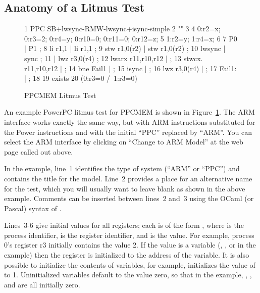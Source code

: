 \subsection{Anatomy of a Litmus Test}
\label{sec:formal:Anatomy of a Litmus Test}

\begin{figure}[tbp]
{ \scriptsize
\begin{verbbox}
 1 PPC SB+lwsync-RMW-lwsync+isync-simple
 2 ""
 3 {
 4 0:r2=x; 0:r3=2; 0:r4=y; 0:r10=0; 0:r11=0; 0:r12=z;
 5 1:r2=y; 1:r4=x;
 6 }
 7  P0                 | P1           ;
 8  li r1,1            | li r1,1      ;
 9  stw r1,0(r2)       | stw r1,0(r2) ;
10  lwsync             | sync         ;
11                     | lwz r3,0(r4) ;
12  lwarx  r11,r10,r12 | ;
13  stwcx. r11,r10,r12 | ;
14  bne Fail1          | ;
15  isync              | ;
16  lwz r3,0(r4)       | ;
17  Fail1:             | ;
18 
19 exists
20 (0:r3=0 /\ 1:r3=0)
\end{verbbox}
}
\centering
\theverbbox
\caption{PPCMEM Litmus Test}
\label{fig:sec:formal:PPCMEM Litmus Test}
\end{figure}

An example PowerPC litmus test for PPCMEM is shown in
Figure~\ref{fig:sec:formal:PPCMEM Litmus Test}.
The ARM interface works exactly the same way, but with ARM instructions
substituted for the Power instructions and with the initial ``PPC''
replaced by ``ARM''. You can select the ARM interface by clicking on
``Change to ARM Model'' at the web page called out above.

In the example, line~1 identifies the type of system (``ARM'' or ``PPC'')
and contains the title for the model. Line~2 provides a place for an
alternative name for the test, which you will usually want to leave
blank as shown in the above example. Comments can be inserted between
lines~2 and~3 using the OCaml (or Pascal) syntax of \nbco{(* *)}.

Lines~3-6 give initial values for all registers; each is of the form
, where  is the process identifier,  is the register
identifier, and  is the value. For example, process 0's register
r3 initially contains the value 2. If the value is a variable (,
, or  in the example) then the register is initialized to the
address of the variable. It is also possible to initialize the contents
of variables, for example,  initializes the value of  to
1. Uninitialized variables default to the value zero, so that in the
example, , , and  are all initially zero.

